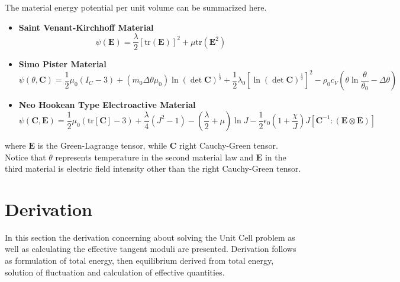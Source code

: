 \documentclass[10pt,a4paper]{scrreprt}
\begin{document}
The material energy potential per unit volume can be summarized here.
\begin{itemize}
	\item[] \textbf{Saint Venant-Kirchhoff Material}
	\begin{equation}
	\label{eq: svk}
	\psi\left( \mathbf{E} \right) = \dfrac{\lambda}{2} \left[ \text{tr}(\mathbf{E}) \right]^{2} + \mu \text{tr} \left( \mathbf{E}^{2} \right)
	\end{equation}
	\item[] \textbf{Simo Pister Material}
	\begin{equation}
	\label{eq: sp mat}
	\psi\left( \theta, \mathbf{C} \right) = \frac{1}{2}\mu_{0} \left( I_{C}-3 \right) + \left( m_{0}\Delta \theta \mu_{0}\right) \ln (\det \mathbf{C})^{\frac{1}{2}} + \frac{1}{2} \lambda_{0} \left[ \ln \left( \det \mathbf{C} \right)^{\frac{1}{2}} \right]^{2} - \rho_{0} c_{V} \left( \theta \ln\dfrac{\theta}{\theta_{0}} - \Delta \theta \right)
	\end{equation}
	\item[] \textbf{Neo Hookean Type Electroactive Material}
	\begin{equation}
	\label{eq: nhk}
	\psi\left( \mathbf{C}, \mathbf{E} \right) =  \frac{1}{2}\mu_{0} \left( \text{tr}[\mathbf{C}]-3 \right) + \dfrac{\lambda}{4} \left( J^{2}-1 \right) - \left( \dfrac{\lambda}{2} + \mu \right) \ln J - \frac{1}{2} \epsilon_{0} \left( 1+\dfrac{\chi}{J} \right) J \left[ \mathbf{C}^{-1}: (\mathbf{E} \otimes \mathbf{E}) \right]
	\end{equation}
\end{itemize}
where $\mathbf{E}$ is the Green-Lagrange tensor, while $\mathbf{C}$ right Cauchy-Green tensor. Notice that $\theta$ represents temperature in the second material law and $\mathbf{E}$ in the third material is electric field intensity other than the right Cauchy-Green tensor.

\section{Derivation}
In this section the derivation concerning about solving the Unit Cell problem as well as calculating the effective tangent moduli are presented. Derivation follows as formulation of total energy, then equilibrium derived from total energy, solution of fluctuation and calculation of effective quantities.
\end{document}
